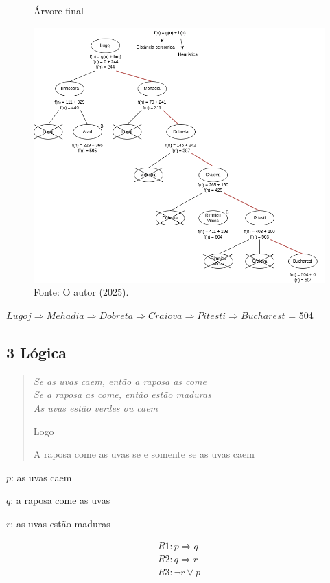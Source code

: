 \begin{figure}[H]
\centering
\caption{Árvore final}
\includegraphics[width=0.8\linewidth]{apendices/fig/1_IAA001_4.png}
\caption*{Fonte: O autor (2025).}
\label{arvoreF}
\end{figure}

$Lugoj \Rightarrow Mehadia \Rightarrow Dobreta \Rightarrow Craiova \Rightarrow Pitesti \Rightarrow Bucharest$ = 504

\subsection*{\textbf{3 Lógica}}
\begin{adjustwidth}{3em}{}
\begin{quote}
    \itshape
    Se as uvas caem, então a raposa as come \\
    Se a raposa as come, então estão maduras \\
    As uvas estão verdes ou caem

    Logo

    A raposa come as uvas se e somente se as uvas caem
\end{quote}
\end{adjustwidth}

$p$: as uvas caem 

$q$: a raposa come as uvas 

$r$: as uvas estão maduras

\begin{equation*}
    \begin{gathered}
        R1: p \Rightarrow q \\
        R2: q \Rightarrow r \\
        R3: \neg{r} \lor p \\
    \end{gathered}
\end{equation*}

